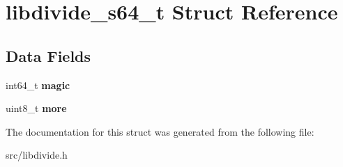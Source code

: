 \hypertarget{structlibdivide__s64__t}{}\section{libdivide\+\_\+s64\+\_\+t Struct Reference}
\label{structlibdivide__s64__t}
\subsection*{Data Fields}
\begin{DoxyCompactItemize}
\item 
\mbox{\label{structlibdivide__s64__t_afd30f65696401254775387f3f842b5b8}} 
int64\+\_\+t {\bfseries magic}
\item 
\mbox{\label{structlibdivide__s64__t_a4d9acecbd922a8da45c66aa83c7bf857}} 
uint8\+\_\+t {\bfseries more}
\end{DoxyCompactItemize}


The documentation for this struct was generated from the following file\+:\begin{DoxyCompactItemize}
\item 
src/libdivide.\+h\end{DoxyCompactItemize}
